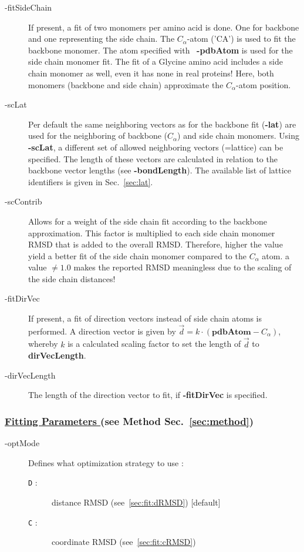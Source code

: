 \documentclass{article}
\newcommand{\CA}{$C_\alpha$}
\begin{document}
\begin{description}
	\item[-fitSideChain] If present, a fit of two monomers per amino acid is done.
	One for backbone and one representing the side chain. The \CA-atom ('CA')
	is used to fit the backbone monomer. The atom specified with \mbox{\bfseries
	-pdbAtom} is used for the side chain monomer fit.
	 The fit of a Glycine amino acid 
	includes a side chain monomer as well, even it has none in real proteins!
	Here, both monomers (backbone and side chain) approximate the \CA-atom
	position.
	\item[-scLat] Per default the same neighboring vectors as for the backbone fit
	(\mbox{\bfseries -lat}) are used for the neighboring of backbone
	(\CA) and side chain monomers. Using \mbox{\bfseries -scLat}, a different
	set of allowed neighboring vectors (=lattice) can be specified. The length of
	these vectors are calculated in relation to the backbone vector lengths 
	(see \mbox{\bfseries -bondLength}). The
	available list of lattice identifiers is given in Sec.~\ref{sec:lat}.
	\item[-scContrib] Allows for a weight of the side chain fit according to the
	backbone approximation. This factor is multiplied to each side chain monomer
	RMSD that is added to the overall RMSD. Therefore, higher the value yield
	a better fit of the side chain monomer compared to the \CA{} atom.
	 a value $\not = 1.0$ makes the reported RMSD
	meaningless due to the scaling of the side chain distances!
	\item[-fitDirVec] If present, a fit of direction vectors instead of side chain
	atoms is performed. A
	direction vector is given by \mbox{$\vec{d}=k\cdot(\textbf{pdbAtom}-C_\alpha)$}, whereby $k$ is a calculated
	scaling factor to set the length of $\vec{d}$ to \mbox{\bfseries dirVecLength}.
	\item[-dirVecLength] The length of the direction vector to fit, if
	\mbox{\bfseries -fitDirVec} is specified.
\end{description}


\subsubsection*{\underline{ Fitting Parameters } (see Method
Sec.~\ref{sec:method})}

\begin{description}
	\item[-optMode] Defines what optimization strategy to use :
		\begin{description} 
			\item[\texttt{D} :] distance RMSD (see~\ref{sec:fit:dRMSD}) [default]
			\item[\texttt{C} :] coordinate RMSD (see~\ref{sec:fit:cRMSD})
		\end{description} 
\end{description}
\end{document}
